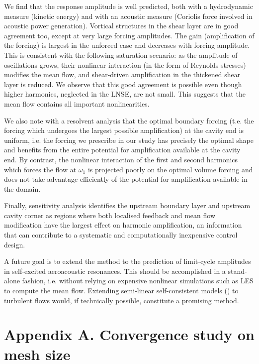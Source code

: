 \documentclass[11pt,onecolumn]{article}
\begin{document}
We find that the response amplitude is well predicted, both with a hydrodynamic measure (kinetic energy) and with an acoustic measure (Coriolis force involved in acoustic power generation). 
Vortical structures in the shear layer are in good agreement too, except at very large forcing amplitudes.
The gain (amplification of the forcing) is largest in the unforced case and decreases with forcing amplitude. 
This is consistent with the following saturation scenario: as the amplitude of oscillations grows, their nonlinear interaction (in the form of Reynolds stresses) modifies the mean flow, and shear-driven amplification in the thickened shear layer is reduced.
We observe that this good agreement is possible even though higher harmonics, neglected in the LNSE, are not small. This suggests that the mean flow contains all important nonlinearities.

We also note with a resolvent analysis that the optimal boundary forcing (t.e. the forcing which undergoes the largest possible amplification) at the cavity end is uniform, i.e. the forcing we prescribe in our study has precisely the optimal shape and benefits from the entire potential for amplification available at the cavity end. 
By contrast, the nonlinear interaction of the first and second harmonics which forces the flow at $\omega_1$ is projected poorly on the optimal volume forcing and does not take advantage efficiently of the potential for amplification available in the domain.

Finally, sensitivity analysis identifies  the upstream boundary layer and upstream cavity corner as regions where both localised feedback and mean flow modification have the largest effect on harmonic amplification, an information that can contribute to a systematic and computationally inexpensive control design.

A future goal is to extend the method to the prediction of limit-cycle amplitudes in self-excited aeroacoustic resonances. 
This should be accomplished in a stand-alone fashion, i.e. without relying on expensive nonlinear simulations such as LES to compute the mean flow. 
Extending semi-linear self-consistent models (\cite{Mantic2014, Mantic2016}) to turbulent flows would, if technically possible, constitute a promising method.


\section*{Appendix A. Convergence study on mesh size}
\end{document}
